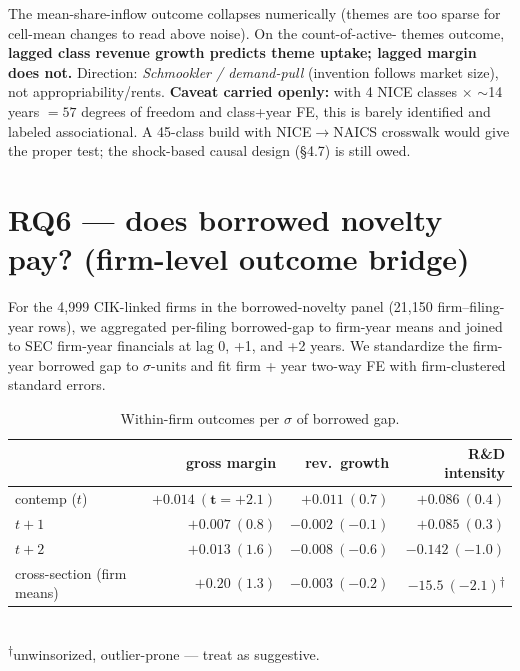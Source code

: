 \documentclass[11pt]{article}
\begin{document}
\noindent The mean-share-inflow outcome collapses numerically (themes are too
sparse for cell-mean changes to read above noise). On the count-of-active-
themes outcome, \textbf{lagged class revenue growth predicts theme uptake;
lagged margin does not.} Direction: \emph{Schmookler / demand-pull}
(invention follows market size), not appropriability/rents. \textbf{Caveat
carried openly:} with 4 NICE classes $\times$ $\sim$14 years $= 57$ degrees of
freedom and class+year FE, this is barely identified and labeled
associational. A 45-class build with NICE$\to$NAICS crosswalk would give the
proper test; the shock-based causal design (§4.7) is still owed.

\section{RQ6 --- does borrowed novelty pay? (firm-level outcome bridge)}
For the 4{,}999 CIK-linked firms in the borrowed-novelty panel (21{,}150
firm--filing-year rows), we aggregated per-filing borrowed-gap to firm-year
means and joined to SEC firm-year financials at lag 0, +1, and +2 years. We
standardize the firm-year borrowed gap to $\sigma$-units and fit firm + year
two-way FE with firm-clustered standard errors.

\begin{table}[h]\centering\small
\caption{Within-firm outcomes per $\sigma$ of borrowed gap.}
\begin{tabular}{lrrr}
\toprule
& gross margin & rev.\ growth & R\&D intensity \\
\midrule
contemp ($t$)   & $\mathbf{+0.014\ (t=+2.1)}$ & $+0.011\ (0.7)$ & $+0.086\ (0.4)$ \\
$t+1$           & $+0.007\ (0.8)$            & $-0.002\ (-0.1)$& $+0.085\ (0.3)$ \\
$t+2$           & $+0.013\ (1.6)$            & $-0.008\ (-0.6)$& $-0.142\ (-1.0)$ \\
\midrule
cross-section (firm means) & $+0.20\ (1.3)$  & $-0.003\ (-0.2)$ & $\mathbf{-15.5\ (-2.1)}$\textsuperscript{$\dagger$} \\
\bottomrule
\end{tabular}
\\[-2pt]
\textsuperscript{$\dagger$}\footnotesize unwinsorized, outlier-prone --- treat as suggestive.
\end{table}
\end{document}
